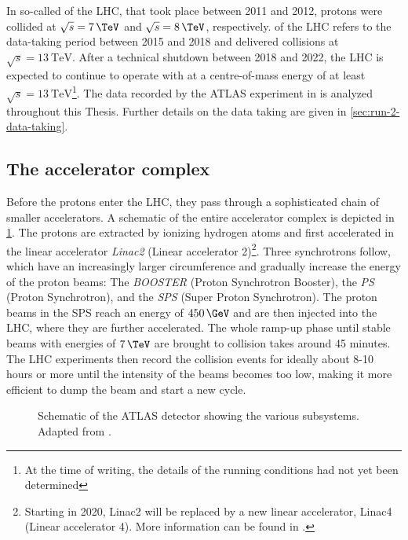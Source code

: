 In so-called \RunOne of the LHC, that took place between 2011 and 2012, protons were collided at $\sqrt{s} = 7\,\TeV$ and $\sqrt{s} = 8\,\TeV$, respectively. \RunTwo of the LHC refers to the data-taking period between 2015 and 2018 and delivered collisions at $\sqrt{s} = \SI{13}{\TeV}$. After a technical shutdown between 2018 and 2022, the LHC is expected to continue to operate with \RunThr at a centre-of-mass energy of at least $\sqrt{s} = \SI{13}{\TeV}$\footnote{At the time of writing, the details of the \RunThr running conditions had not yet been determined}.
The data recorded by the ATLAS experiment in \RunTwo is analyzed throughout this Thesis. Further details on the \RunTwo data taking are given in \cref{sec:run-2-data-taking}.


\subsection{The accelerator complex}
Before the protons enter the LHC, they pass through a sophisticated chain of smaller accelerators. A schematic of the entire accelerator complex is depicted in \cref{fig:accelerator-complex}.
The protons are extracted by ionizing hydrogen atoms and first accelerated in the linear accelerator \emph{Linac2} (Linear accelerator 2)\footnote{Starting in 2020, Linac2 will be replaced by a new linear accelerator, Linac4 (Linear accelerator 4). More information can be found in .}. Three synchrotrons follow, which have an increasingly larger circumference and gradually increase the energy of the proton beams: The \emph{BOOSTER} (Proton Synchrotron Booster), the \emph{PS} (Proton Synchrotron), and the \emph{SPS} (Super Proton Synchrotron). The proton beams in the SPS reach an energy of $450\,\GeV$ and are then injected into the LHC, where they are further accelerated. The whole ramp-up phase until stable beams with energies of $7\,\TeV$ are brought to collision takes around 45 minutes. The LHC experiments then record the collision events for ideally about 8-10 hours or more until the intensity of the beams becomes too low, making it more efficient to dump the beam and start a new cycle.

\begin{figure}
    \caption[Schematic of the ATLAS detector showing the various subsystems.]{Schematic of the ATLAS detector showing the various subsystems. Adapted from .}
    \label{fig:accelerator-complex}
\end{figure}









